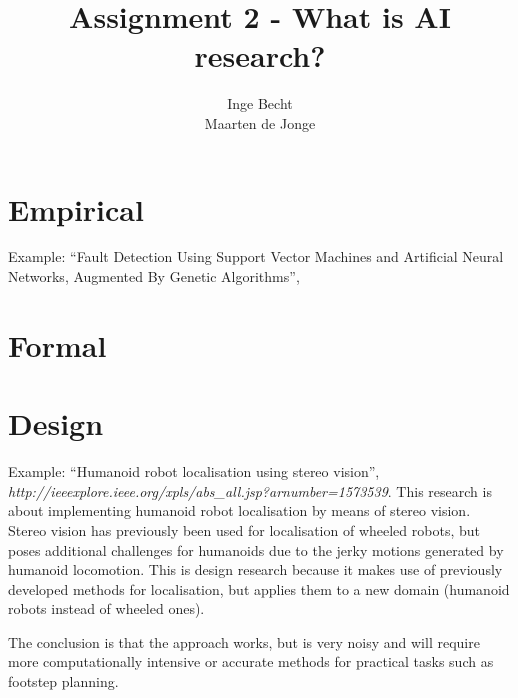 \documentclass[a4paper, 12pt]{article}
\author{Inge Becht \\ Maarten de Jonge}
\title{Assignment 2 - What is AI research?}
\begin{document}
\maketitle

\section{Empirical}
Example: ``Fault Detection Using Support Vector Machines and Artificial Neural
Networks, Augmented By Genetic Algorithms'',


\section{Formal}

\section{Design}
Example: ``Humanoid robot localisation using stereo vision'',
\emph{http://ieeexplore.ieee.org/xpls/abs_all.jsp?arnumber=1573539}.
This research is about implementing humanoid robot localisation by means of
stereo vision. Stereo vision has previously been used for localisation of
wheeled robots, but poses additional challenges for humanoids due to the jerky
motions generated by humanoid locomotion.
This is design research because it makes use of previously developed methods for
localisation, but applies them to a new domain (humanoid robots instead of
wheeled ones).

The conclusion is that the approach works, but is very noisy and will require
more computationally intensive or accurate methods for practical tasks such as
footstep planning.
	
\end{document}
